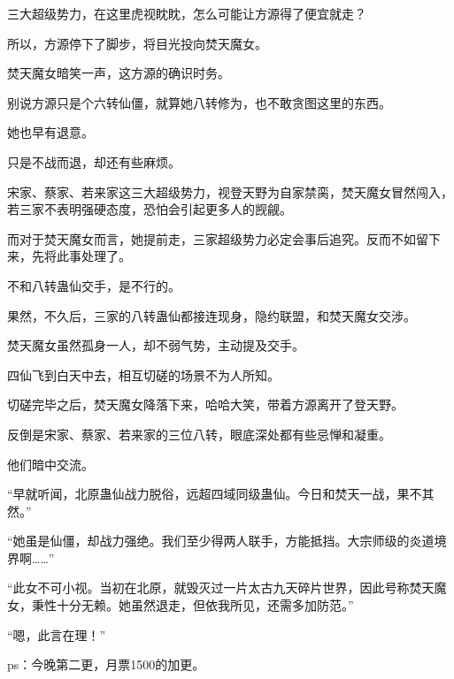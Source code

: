 \begin{this_body}
三大超级势力，在这里虎视眈眈，怎么可能让方源得了便宜就走？

所以，方源停下了脚步，将目光投向焚天魔女。

焚天魔女暗笑一声，这方源的确识时务。

别说方源只是个六转仙僵，就算她八转修为，也不敢贪图这里的东西。

她也早有退意。

只是不战而退，却还有些麻烦。

宋家、蔡家、若来家这三大超级势力，视登天野为自家禁脔，焚天魔女冒然闯入，若三家不表明强硬态度，恐怕会引起更多人的觊觎。

而对于焚天魔女而言，她提前走，三家超级势力必定会事后追究。反而不如留下来，先将此事处理了。

不和八转蛊仙交手，是不行的。

果然，不久后，三家的八转蛊仙都接连现身，隐约联盟，和焚天魔女交涉。

焚天魔女虽然孤身一人，却不弱气势，主动提及交手。

四仙飞到白天中去，相互切磋的场景不为人所知。

切磋完毕之后，焚天魔女降落下来，哈哈大笑，带着方源离开了登天野。

反倒是宋家、蔡家、若来家的三位八转，眼底深处都有些忌惮和凝重。

他们暗中交流。

“早就听闻，北原蛊仙战力脱俗，远超四域同级蛊仙。今日和焚天一战，果不其然。”

“她虽是仙僵，却战力强绝。我们至少得两人联手，方能抵挡。大宗师级的炎道境界啊……”

“此女不可小视。当初在北原，就毁灭过一片太古九天碎片世界，因此号称焚天魔女，秉性十分无赖。她虽然退走，但依我所见，还需多加防范。”

“嗯，此言在理！”

ps：今晚第二更，月票1500的加更。

\end{this_body}

